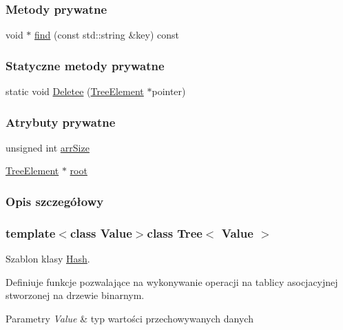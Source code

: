 \subsubsection*{Metody prywatne}
\begin{DoxyCompactItemize}
\item 
void $\ast$ \hyperlink{class_tree_a3385398b3c32da1d5e19ed2c68aac214}{find} (const std\-::string \&key) const 
\end{DoxyCompactItemize}
\subsubsection*{Statyczne metody prywatne}
\begin{DoxyCompactItemize}
\item 
static void \hyperlink{class_tree_a3be4a153d072838ca05b9000e86d99e4}{Deletee} (\hyperlink{class_tree_1_1_tree_element}{Tree\-Element} $\ast$pointer)
\end{DoxyCompactItemize}
\subsubsection*{Atrybuty prywatne}
\begin{DoxyCompactItemize}
\item 
unsigned int \hyperlink{class_tree_aff00e7392acb5a5610eac7a3959bdb01}{arr\-Size}
\item 
\hyperlink{class_tree_1_1_tree_element}{Tree\-Element} $\ast$ \hyperlink{class_tree_aa9e3ed038d05213099bc5e0a26ecc219}{root}
\end{DoxyCompactItemize}


\subsubsection{Opis szczegółowy}
\subsubsection*{template$<$class Value$>$class Tree$<$ Value $>$}

Szablon klasy \hyperlink{class_hash}{Hash}. 

Definiuje funkcje pozwalające na wykonywanie operacji na tablicy asocjacyjnej stworzonej na drzewie binarnym. 
\begin{DoxyParams}{Parametry}
{\em Value} & typ wartości przechowywanych danych \\
\hline
\end{DoxyParams}


